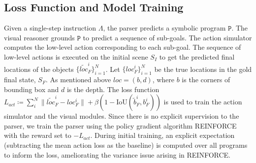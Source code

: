 \subsection{Loss Function and Model Training}
\label{subsec:loss&training}
Given a single-step instruction $\Lambda$, the parser predicts a symbolic program $\mathtt{P}$. The visual reasoner grounds $\mathtt{P}$ to predict a sequence of sub-goals. The action simulator computes the low-level action corresponding to each sub-goal. The sequence of low-level actions is executed on the initial scene $S_I$ to get the predicted final locations of the objects $\{\widetilde{loc}^i_F\}_{i=1}^N$. Let $\{{loc}^i_F\}_{i=1}^N$ be the true locations in the gold final state, $S_F$. As mentioned above $loc = (b,d)$, where $b$ is the corners of bounding box and $d$ is the depth. The loss function $L_{act}\coloneqq \sum_i^N\|\widetilde{loc}^i_F- loc^i_F\|
+ \beta (1-\text{IoU}(\widetilde{b}^i_F, b^i_F))$ is used to train the action simulator and the visual modules. 
Since there is no explicit supervision to the parser, we train the parser using the policy gradient algorithm REINFORCE with the reward set to $-L_{act}$. 
%
During initial training, an explicit expectation (subtracting the mean action loss as the baseline) is computed over all programs to inform the loss, ameliorating the variance issue arising in REINFORCE.
